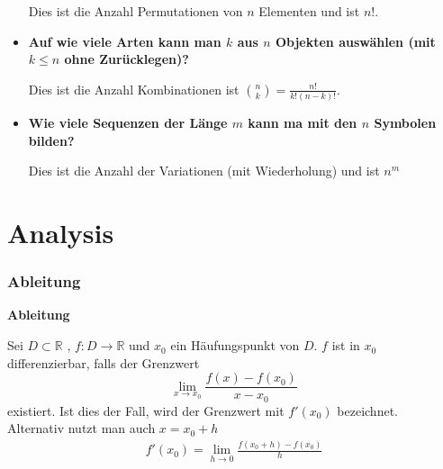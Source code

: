 \documentclass[25pt]{sciposter}
\newcommand{\R}{\mathbb{R}}
\newenvironment{method}[1]{\begin{mdframed}[backgroundcolor=blue!10,innertopmargin=15pt, innerbottommargin=15pt,nobreak=true]
		\textbf{#1 }
	}
	{ 
	\end{mdframed}
}
\begin{document}
\begin{multicols}{3}
\begin{itemize}
			Dies ist die Anzahl Permutationen von $n$ Elementen und ist $n!$.
			
			
			\item 	\textbf{Auf wie viele Arten kann man $k$ aus $n$ Objekten auswählen (mit $k\leq n$ ohne Zurücklegen)?}
			
			Dies ist die Anzahl Kombinationen ist $\binom{n}{k} = \frac{n!}{k!(n-k)!}$.
			
			
			\item \textbf{Wie viele Sequenzen der Länge $m$ kann ma mit den $n$ Symbolen bilden?}
			
			Dies ist die Anzahl der Variationen (mit Wiederholung) und ist $n^m$
		\end{itemize}
		
		
		
		
		
		
		
		
		
		
		
		
		
		
		
		\part{Analysis}
		
		\section{Ableitung}
		
		\begin{method}{Ableitung}
			Sei $D \subset \R$ , $f:D \to  \R$ und $x_0$ ein Häufungspunkt von $D$. $f$ ist in $x_0$ differenzierbar, falls der Grenzwert 
			$$ \lim\limits_{x \to x_0} \frac{f(x) -f(x_0)}{x-x_0}$$
			existiert. Ist dies der Fall, wird der Grenzwert mit $f'(x_0)$ bezeichnet.\\
			Alternativ nutzt man auch $x = x_0 + h$
			\begin{align*}
				f'(x_0) = \lim\limits_{h \to 0} \frac{f(x_0 + h) - f(x_0)}{h}
			\end{align*}
		\end{method}
		

\end{multicols}
\end{document}
